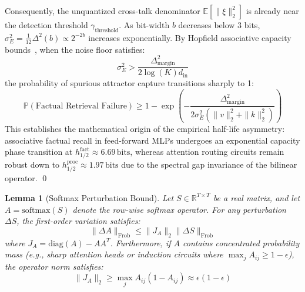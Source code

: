 \documentclass[10pt,twocolumn,letterpaper]{article}
\newtheorem{lemma}[theorem]{Lemma}
\newcommand{\E}{\mathbb{E}}
\newcommand{\R}{\mathbb{R}}
\begin{document}
Consequently, the unquantized cross-talk denominator $\E[\|\xi\|_2^2]$ is already near the detection threshold $\gamma_{\text{threshold}}$. As bit-width $b$ decreases below 3 bits, $\sigma_E^2 = \frac{1}{12} \Delta^2(b) \propto 2^{-2b}$ increases exponentially. By Hopfield associative capacity bounds~\cite{li2016ternary}, when the noise floor satisfies:
\begin{equation}
    \sigma_E^2 > \frac{\Delta_{\text{margin}}^2}{2 \log(K) d_{\text{in}}}
\end{equation}
the probability of spurious attractor capture transitions sharply to 1:
\begin{equation}
    \mathbb{P}(\text{Factual Retrieval Failure}) \ge 1 - \exp\left( - \frac{\Delta_{\text{margin}}^2}{2 \sigma_E^2 (\|v\|_2^2 + \|k\|_2^2)} \right)
\end{equation}
This establishes the mathematical origin of the empirical half-life asymmetry: associative factual recall in feed-forward MLPs undergoes an exponential capacity phase transition at $h_{1/2}^{\text{fact}} \approx 6.69\,\text{bits}$, whereas attention routing circuits remain robust down to $h_{1/2}^{\text{proc}} \approx 1.97\,\text{bits}$ due to the spectral gap invariance of the bilinear operator. \qed

\begin{lemma}[Softmax Perturbation Bound]
Let $S \in \R^{T \times T}$ be a real matrix, and let $A = \text{softmax}(S)$ denote the row-wise softmax operator. For any perturbation $\Delta S$, the first-order variation satisfies:
\begin{equation}
    \|\Delta A\|_{\text{Frob}} \le \|J_A\|_2 \|\Delta S\|_{\text{Frob}}
\end{equation}
where $J_A = \text{diag}(A) - A A^T$. Furthermore, if $A$ contains concentrated probability mass (e.g., sharp attention heads or induction circuits where $\max_j A_{ij} \ge 1 - \epsilon$), the operator norm satisfies:
\begin{equation}
    \|J_A\|_2 \ge \max_j A_{ij}(1 - A_{ij}) \approx \epsilon(1 - \epsilon)
\end{equation}
\end{lemma}
\end{document}
